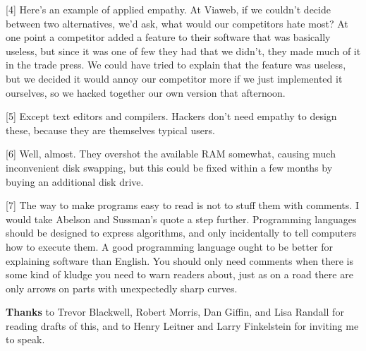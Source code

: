 {[}4{]} Here's an example of applied empathy. At Viaweb, if we couldn't
decide between two alternatives, we'd ask, what would our competitors
hate most? At one point a competitor added a feature to their software
that was basically useless, but since it was one of few they had that we
didn't, they made much of it in the trade press. We could have tried to
explain that the feature was useless, but we decided it would annoy our
competitor more if we just implemented it ourselves, so we hacked
together our own version that afternoon.

{[}5{]} Except text editors and compilers. Hackers don't need empathy to
design these, because they are themselves typical users.

{[}6{]} Well, almost. They overshot the available RAM somewhat, causing
much inconvenient disk swapping, but this could be fixed within a few
months by buying an additional disk drive.

{[}7{]} The way to make programs easy to read is not to stuff them with
comments. I would take Abelson and Sussman's quote a step further.
Programming languages should be designed to express algorithms, and only
incidentally to tell computers how to execute them. A good programming
language ought to be better for explaining software than English. You
should only need comments when there is some kind of kludge you need to
warn readers about, just as on a road there are only arrows on parts
with unexpectedly sharp curves.

\textbf{Thanks} to Trevor Blackwell, Robert Morris, Dan Giffin, and Lisa
Randall for reading drafts of this, and to Henry Leitner and Larry
Finkelstein for inviting me to speak.
